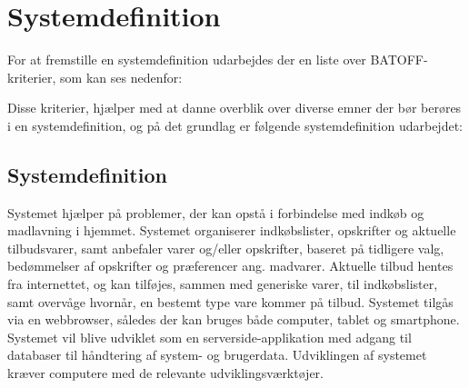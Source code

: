 \chapter{Systemdefinition}

For at fremstille en systemdefinition udarbejdes der en liste over BATOFF-kriterier\citep{OOA&D2001}, som kan ses nedenfor:



Disse kriterier, hjælper med at danne overblik over diverse emner der bør berøres i en systemdefinition, og på det grundlag er følgende systemdefinition udarbejdet:

\section{Systemdefinition}

Systemet hjælper på problemer, der kan opstå i forbindelse med indkøb og madlavning i hjemmet. 
Systemet organiserer indkøbslister, opskrifter og aktuelle tilbudsvarer, samt anbefaler varer og/eller opskrifter, baseret på tidligere valg, bedømmelser af opskrifter og præferencer ang. madvarer. 
Aktuelle tilbud hentes fra internettet, og kan tilføjes, sammen med generiske varer, til indkøbslister, samt overvåge hvornår, en bestemt type vare kommer på tilbud.
Systemet tilgås via en webbrowser, således der kan bruges både computer, tablet og smartphone. 
Systemet vil blive udviklet som en serverside-applikation med adgang til databaser til håndtering af system- og brugerdata. 
Udviklingen af systemet kræver computere med de relevante udviklingsværktøjer. 